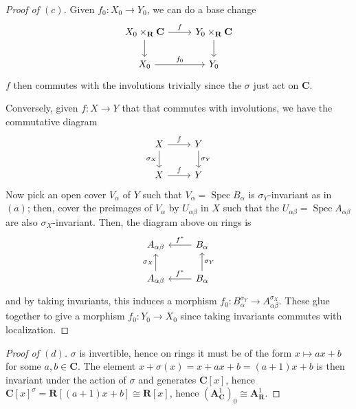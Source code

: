 \documentclass[10pt]{article}
\theoremstyle{definition}
\theoremstyle{remark}
\numberwithin{equation}{section}
\numberwithin{figure}{subsubsection}
\DeclareMathOperator{\Spec}{Spec}
\begin{document}
\begin{proof}[Proof of $(c)$]
  Given $f_0 \colon X_0 \to Y_0$, we can do a base change
  \begin{equation*}
    \begin{tikzcd}
      X_0 \times_\mathbf{R} \mathbf{C} \rar{f}\dar & Y_0 \times_\mathbf{R}
      \mathbf{C}\dar\\
      X_0 \rar{f_0} & Y_0
    \end{tikzcd}
  \end{equation*}
  $f$ then commutes with the involutions trivially since the $\sigma$ just act
  on $\mathbf{C}$.
  \par Conversely, given $f\colon X \to Y$ that that commutes with involutions,
  we have the commutative diagram
  \begin{equation*}
    \begin{tikzcd}
      X \rar{f}\dar[swap]{\sigma_X} & Y\dar{\sigma_Y}\\
      X \rar{f} & Y
    \end{tikzcd}
  \end{equation*}
  Now pick an open cover $V_\alpha$ of $Y$ such that $V_\alpha = \Spec B_\alpha$ is
  $\sigma_Y$-invariant as in $(a)$; then, cover the preimages of $V_\alpha$ by
  $U_{\alpha\beta}$ in $X$ such that the $U_{\alpha\beta} = \Spec A_{\alpha\beta}$
  are also $\sigma_X$-invariant. Then, the diagram above on rings is
  \begin{equation*}
    \begin{tikzcd}
      A_{\alpha\beta} & B_\alpha \lar[swap]{f^*}\\
      A_{\alpha\beta}\uar{\sigma_X} & B_\alpha \lar[swap]{f^*}\uar[swap]{\sigma_Y}
    \end{tikzcd}
  \end{equation*}
  and by taking invariants, this induces a morphism $f_0\colon
  B_{\alpha}^{\sigma_Y} \to A_{\alpha\beta}^{\sigma_X}$. These glue together to
  give a morphism $f_0 \colon Y_0 \to X_0$ since taking invariants commutes with
  localization.
\end{proof}
\begin{proof}[Proof of $(d)$]
  $\sigma$ is invertible, hence on rings it must be of the form $x \mapsto ax + b$
  for some $a,b \in \mathbf{C}$. The element $x + \sigma(x) = x + ax+b = (a+1)x + b$
  is then invariant under the action of $\sigma$ and generates $\mathbf{C}[x]$,
  hence $\mathbf{C}[x]^\sigma = \mathbf{R}[(a+1)x+b] \cong \mathbf{R}[x]$, hence
  $(\mathbf{A}^1_\mathbf{C})_0 \cong \mathbf{A}^1_\mathbf{R}$.
\end{proof}
\end{document}
